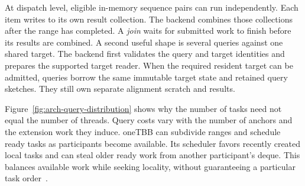 At dispatch level, eligible in-memory sequence pairs can run independently.
Each item writes to its own result collection. The backend combines those
collections after the range has completed. A \emph{join} waits for submitted
work to finish before its results are combined. A second useful shape is several
queries against one shared target. The backend first validates the query
and target identities and prepares the supported target reader. When the
required resident target can be admitted, queries borrow the same immutable
target state and retained query sketches. They still own separate alignment
scratch and results.

Figure~\ref{fig:arch-query-distribution} shows why the number of tasks need
not equal the number of threads. Query costs vary with the number of anchors
and the extension work they induce. oneTBB can subdivide ranges and schedule
ready tasks as participants become available. Its scheduler favors recently
created local tasks and can steal older ready work from another
participant's deque. This balances available work while seeking locality,
without guaranteeing a particular task order~\autocite{onetbbScheduler}.

